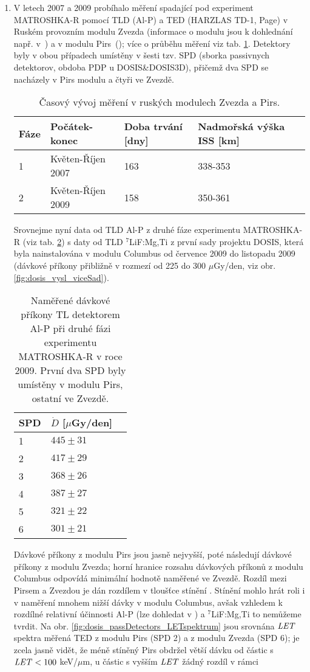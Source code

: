 \begin{enumerate}
\item V letech 2007 a 2009 probíhalo měření spadající pod experiment MATROSHKA-R pomocí TLD (Al-P) a TED (HARZLAS TD-1, Page) v Ruském provozním modulu Zvezda (informace o modulu jsou k dohlednání např. v~\cite{serviceModule}) a v modulu Pirs~(\cite{piers1}); více o průběhu měření viz tab. \ref{tab:dosis_passDetectors_timeline}. Detektory byly v obou případech umístěny v šesti tzv. SPD (sborka passivnych detektorov, obdoba PDP u DOSIS\&DOSIS3D), přičemž dva SPD se nacházely v Pirs modulu a čtyři ve Zvezdě. 
\begin{table}[h]
  \centering
  \caption{Časový vývoj měření v ruských modulech Zvezda a Pirs. \cite{passDetectors}}
  \label{tab:dosis_passDetectors_timeline}
  \begin{tabular}{llll}
	\toprule
	Fáze&Počátek-konec&Doba trvání [dny]&Nadmořská výška ISS [km]\\
	\midrule
	1&Květen-Říjen 2007&163&338-353\\
	2&Květen-Říjen 2009&158&350-361\\
	\bottomrule
  \end{tabular}
\end{table}
Srovnejme nyní data od TLD Al-P z druhé fáze experimentu MATROSHKA-R (viz tab. \ref{tab:dosis_passDetectors_vysledky}) s daty od TLD $^7$LiF:Mg,Ti z první sady projektu DOSIS, která byla nainstalována v modulu Columbus od července 2009 do listopadu 2009 (dávkové příkony přibližně v rozmezí od 225 do 300 $\mu$Gy/den, viz obr. \ref{fig:dosis_vysl_viceSad}). 
\begin{table}[h]
  \centering
  \caption{Naměřené dávkové příkony TL detektorem Al-P při druhé fázi experimentu MATROSHKA-R v roce 2009. První dva SPD byly umístěny v modulu Pirs, ostatní ve Zvezdě. \cite{passDetectors}}
  \label{tab:dosis_passDetectors_vysledky}
  \begin{tabular}{lll}
	\toprule
	SPD&$\dot{D}$ [$\mu$Gy/den]\\
	\midrule
	1&$445\pm31$\\
	2&$417\pm29$\\
	3&$368\pm26$\\
	4&$387\pm27$\\
	5&$321\pm22$\\
	6&$301\pm21$\\
	\bottomrule
  \end{tabular}
\end{table}
Dávkové příkony z modulu Pirs jsou jasně nejvyšší, poté následují dávkové příkony z modulu Zvezda; horní hranice rozsahu dávkových příkonů z modulu Columbus odpovídá minimální hodnotě naměřené ve Zvezdě. Rozdíl mezi Pirsem a Zvezdou je dán rozdílem v tloušťce stínění \cite{passDetectors}. Stínění mohlo hrát roli i v naměření mnohem nižší dávky v modulu Columbus, avšak vzhledem k rozdílné relativní účinnosti Al-P (lze dohledat v \cite{dataTLD_RR}) a $^7$LiF:Mg,Ti to nemůžeme tvrdit. Na obr. \ref{fig:dosis_passDetectors_LETspektrum} jsou srovnána $\mathit{LET}$ spektra měřená TED z modulu Pirs (SPD 2) a z modulu Zvezda (SPD 6); je zcela jasně vidět, že méně stíněný Pirs obdržel větší dávku od částic s $\mathit{LET}<100$ keV/$\mu$m, u částic s vyšším $\mathit{LET}$ žádný rozdíl v rámci

\end{enumerate}
